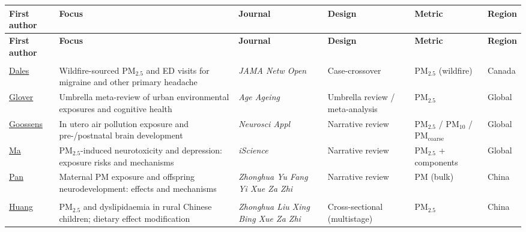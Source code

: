 {\fontsize{6.7}{8.4}\selectfont
\setlength{\tabcolsep}{2.4pt}
\begin{longtable}{@{}>{\RaggedRight}p{25mm}>{\RaggedRight}p{41mm}>{\RaggedRight}p{27mm}%
>{\RaggedRight}p{23mm}>{\RaggedRight}p{18mm}>{\RaggedRight}p{15mm}@{}}
\toprule
\textsf{\textbf{First author}} & \textsf{\textbf{Focus}} & \textsf{\textbf{Journal}} &
\textsf{\textbf{Design}} & \textsf{\textbf{Metric}} & \textsf{\textbf{Region}}\\
\midrule
\endfirsthead
\toprule
\textsf{\textbf{First author}} & \textsf{\textbf{Focus}} & \textsf{\textbf{Journal}} &
\textsf{\textbf{Design}} & \textsf{\textbf{Metric}} & \textsf{\textbf{Region}}\\
\midrule
\endhead
\multicolumn{6}{@{}l@{}}{\cellcolor{Mist}\textsf{\textbf{\textcolor{Deep}{Neuro / mental health}}}}\\[0.6mm]
\href{https://doi.org/10.1001/jamanetworkopen.2026.25015}{Dales} & Wildfire-sourced PM$_{2.5}$ and ED visits for migraine and other primary headache & \textit{JAMA Netw Open} & Case-crossover & PM$_{2.5}$ (wildfire) & Canada\\
\href{https://doi.org/10.1093/ageing/afag215}{Glover} & Umbrella meta-review of urban environmental exposures and cognitive health & \textit{Age Ageing} & Umbrella review / meta-analysis & PM$_{2.5}$ & Global\\
\href{https://doi.org/10.1016/j.nsa.2026.107019}{Goossens} & In utero air pollution exposure and pre-/postnatal brain development & \textit{Neurosci Appl} & Narrative review & PM$_{2.5}$ / PM$_{10}$ / PM$_{\mathrm{coarse}}$ & Global\\
\href{https://doi.org/10.1016/j.isci.2026.116617}{Ma} & PM$_{2.5}$-induced neurotoxicity and depression: exposure risks and mechanisms & \textit{iScience} & Narrative review & PM$_{2.5}$ + components & Global\\
\href{https://doi.org/10.3760/cma.j.cn112150-20250804-00752}{Pan} & Maternal PM exposure and offspring neurodevelopment: effects and mechanisms & \textit{Zhonghua Yu Fang Yi Xue Za Zhi} & Narrative review & PM (bulk) & China\\
\addlinespace[0.9mm]
\multicolumn{6}{@{}l@{}}{\cellcolor{Mist}\textsf{\textbf{\textcolor{Teal}{Cardiovascular \& metabolic}}}}\\[0.6mm]
\href{https://doi.org/10.3760/cma.j.cn112338-20251120-00843}{Huang} & PM$_{2.5}$ and dyslipidaemia in rural Chinese children; dietary effect modification & \textit{Zhonghua Liu Xing Bing Xue Za Zhi} & Cross-sectional (multistage) & PM$_{2.5}$ & China\\

\end{longtable}}
